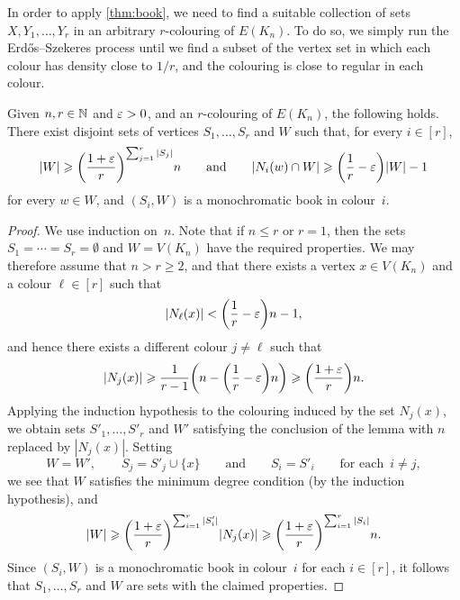In order to apply \autoref{thm:book}, we need to find a suitable collection of sets \(X,Y_1,\ldots,Y_r\) in an arbitrary \(r\)-colouring of \(E(K_n)\). To do so, we simply run the Erd\H{o}s--Szekeres process until we find a subset of the vertex set in which each colour has density close to \(1/r\), and the colouring is close to regular in each colour.
%
\begin{lemma}
  \label{lem:ESz:steps} %
  Given \(n,r \in \mathbb{N}\) and \(\varepsilon > 0\), and an \(r\)-colouring of \(E(K_n)\), the following holds. There exist disjoint sets of vertices \(S_1,\dots,S_r\) and \(W\) such that, for every \(i \in [r]\), 
  \begin{equation*}
    |W| \geqslant \bigg( \frac{1+\varepsilon}{r} \bigg)^{\sum_{j = 1}^r |S_j|} n \qquad \text{and} \qquad |N_i(w) \cap W| \geqslant \bigg( \frac{1}{r} - \varepsilon \bigg) |W| - 1
  \end{equation*}
  for every \(w \in W\), and \((S_i,W)\) is a monochromatic book in colour~\(i\).
\end{lemma}
%
\begin{proof}
  We use induction on~\(n\). Note that if \(n \le r\) or \(r = 1\), then the sets \(S_1 = \cdots = S_r = \emptyset\) and \(W = V(K_n)\) have the required properties. We may therefore assume that \(n > r \ge 2\), and that there exists a vertex \(x \in V(K_n)\) and a colour \(\ell \in [r]\) such that
  \begin{equation*}
    |N_\ell(x)| < \bigg( \frac{1}{r} - \varepsilon \bigg) n - 1,
  \end{equation*}
  and hence there exists a different colour \(j \ne \ell\) such that 
  \begin{equation*}
    |N_j(x)| \geqslant \frac{1}{r-1} \bigg( n - \bigg( \frac{1}{r} - \varepsilon \bigg) n \bigg) \geqslant \bigg( \frac{1 + \varepsilon}{r} \bigg) n.
  \end{equation*}
  Applying the induction hypothesis to the colouring induced by the set \(N_j(x)\), we obtain sets \(S'_1,\ldots,S'_r\) and \(W'\) satisfying the conclusion of the lemma with \(n\) replaced by \(|N_j(x)|\). Setting 
  \begin{equation*}
    W = W', \qquad S_j = S'_j \cup \{x\} \qquad \text{and} \qquad S_i = S'_i \qquad \text{for each } \, i \ne j,
  \end{equation*}
  we see that \(W\) satisfies the minimum degree condition (by the induction hypothesis), and
  \begin{equation*}
    |W| \geqslant \bigg( \frac{1+\varepsilon}{r} \bigg)^{\sum_{i = 1}^r |S'_i|}|N_j(x)| \geqslant \bigg( \frac{1+\varepsilon}{r} \bigg)^{\sum_{i=1}^r |S_i|}n.
  \end{equation*}
  Since \((S_i,W)\) is a monochromatic book in colour~\(i\) for each \(i \in [r]\), it follows that \(S_1,\dots,S_r\) and \(W\) are sets with the claimed properties.
\end{proof}

